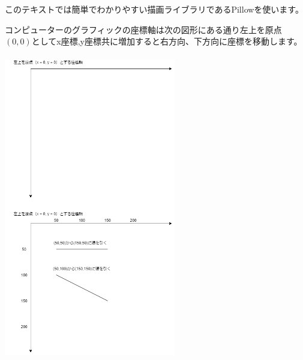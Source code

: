 \documentclass[11pt,a4paper,dvipdfmx,titlepage]{jsreport}
\begin{document}
このテキストでは簡単でわかりやすい描画ライブラリであるPillowを使います。

コンピューターのグラフィックの座標軸は次の図形にある通り左上を原点$(0,0)$としてx座標,y座標共に増加すると右方向、下方向に座標を移動します。
\\
\\


\includegraphics[width=7.5cm]{images/drawimage1.png}
\end{document}
